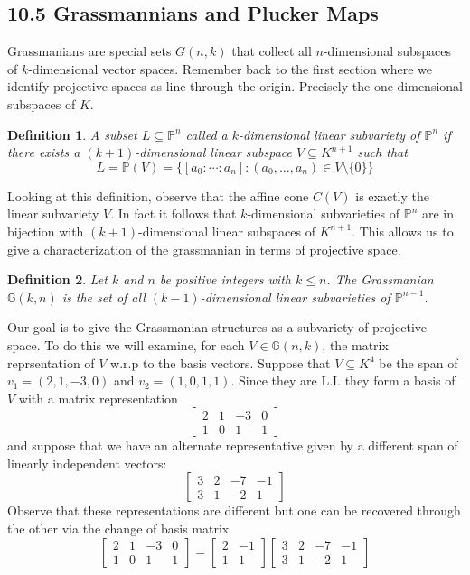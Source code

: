 \documentclass[40pt]{article}
\newtheorem{definition}{Definition}[section]
\newcommand{\Proj}{\mathbb{P}}
\newcommand{\G}{\mathbb{G}}
\theoremstyle{remark}
\begin{document}
				\subsection{10.5 Grassmannians and Plucker Maps}
				Grassmanians are special sets $G(n,k)$ that collect all $n$-dimensional subspaces of $k$-dimensional vector spaces. Remember back to the first section where we identify projective spaces as line through the origin. Precisely the one dimensional subspaces of $K$. 
				\begin{definition}
					A subset $L \subseteq \Proj^n$ called a $k$-dimensional linear subvariety of $\Proj^n$ if there exists a $(k+1)$-dimensional linear subspace $V \subseteq K^{n+1}$ such that 
					\[
					L = \Proj(V) = \{[a_0:\cdots:a_n] : (a_0,\dots,a_n) \in V \setminus \{0\}\}
					\]
				\end{definition}
				Looking at this definition, observe that the affine cone $C(V)$ is exactly the linear subvariety $V$. In fact it follows that $k$-dimensional subvarieties of $\Proj^n$ are in bijection with $(k+1)$-dimensional linear subspaces of $K^{n+1}$. This allows us to give a characterization of the grassmanian in terms of projective space.
				\begin{definition}
					Let $k$ and $n$ be positive integers with $k\leq n$. The Grassmanian $\G(k,n)$ is the set of all $(k-1)$-dimensional linear subvarieties of $\Proj^{n-1}$.
				\end{definition}
				Our goal is to give the Grassmanian structures as a subvariety of projective space. To do this we will examine, for each $V \in \G(n,k)$, the matrix reprsentation of $V$ w.r.p to the basis vectors. Suppose that $V \subseteq K^4$ be the span of $v_1 = (2,1,-3,0)$ and $v_2 = (1,0,1,1)$. Since they are L.I. they form a basis of $V$ with a matrix representation
				\[
				\begin{bmatrix}
					2 & 1 & -3 & 0 \\
					1 & 0 & 1 & 1
				\end{bmatrix}
				\]
				and suppose that we have an alternate representative given by a different span of linearly independent vectors:
				\[
				\begin{bmatrix}
					3 & 2 & -7 & -1 \\
					3 & 1 &-2 &1
				\end{bmatrix}
				\]
				Observe that these representations are different but one can be recovered through the other via the change of basis matrix 
				\[
				\begin{bmatrix}
					2 & 1 & -3 & 0 \\
					1 & 0 & 1 & 1
				\end{bmatrix} = \begin{bmatrix}
				2 &-1 \\
				1&1
				\end{bmatrix}
				\begin{bmatrix}
					3 & 2 & -7 & -1 \\
					3 & 1 &-2 &1
				\end{bmatrix}
				\]
\end{document}

